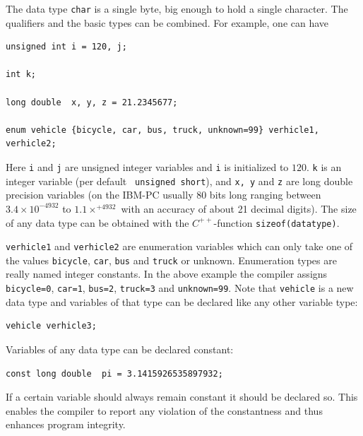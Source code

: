 
The data type \verb+char+ is a single byte, big enough to
hold a single character. The qualifiers and the basic types can be combined.
For example, one can have
{\small \begin{verbatim}
unsigned int i = 120, j;

int k;

long double  x, y, z = 21.2345677;

enum vehicle {bicycle, car, bus, truck, unknown=99} verhicle1, verhicle2;
\end{verbatim}}

\noindent
Here \verb+i+ and \verb+j+ are unsigned integer variables and \verb+i+
is initialized to $120$. \verb+k+ is an integer variable (per default
\verb+ unsigned short+), and \verb+x, y+ and \verb+z+ are long double
precision variables (on the IBM-PC usually 80 bits long ranging between
$3.4 \times 10^{-4932}$ to $1.1 \times^{+4932}$ with an accuracy of
about 21 decimal digits). The size of any data type can be obtained
with the $C^{++}$-function \verb+sizeof(datatype)+. 

\verb+verhicle1+ and \verb+verhicle2+ are enumeration
variables  which can only take one of the values \verb+bicycle+,
\verb+car+, \verb+bus+ and \verb+truck+ or unknown. Enumeration types
 are really named integer constants. In the above
example the compiler assigns \verb+bicycle=0+,
\verb+car=1+, \verb+bus=2+, \verb+truck=3+ and \verb+unknown=99+.
Note that \verb+vehicle+ is a new data type and variables of that type
can be declared like any other variable type:
{\small \begin{verbatim}
vehicle verhicle3;
\end{verbatim}}
\noindent
Variables of any data type can be declared constant:
{\small \begin{verbatim}
const long double  pi = 3.1415926535897932;
\end{verbatim}}
\noindent
If a certain variable should always remain constant it should be declared so. This
enables the compiler to report any violation of the constantness and thus enhances
program integrity.

